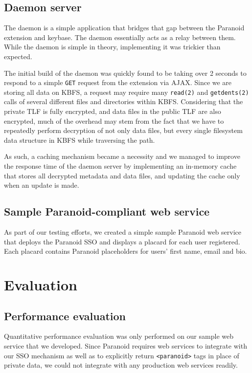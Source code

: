 \documentclass[letterpaper,twocolumn,10pt]{article}
\begin{document}
\subsection{Daemon server}

The daemon is a simple application that bridges that gap between the Paranoid extension and keybase. The daemon essentially acts as a relay between them. While the daemon is simple in theory, implementing it was trickier than expected.

The initial build of the daemon was quickly found to be taking over 2 seconds to respond to a simple \texttt{GET} request from the extension via AJAX. Since we are storing all data on KBFS, a request may require many \texttt{read(2)} and \texttt{getdents(2)} calls of several different files and directories within KBFS. Considering that the private TLF is fully encrypted, and data files in the public TLF are also encrypted, much of the overhead may stem from the fact that we have to repeatedly perform decryption of not only data files, but every single filesystem data structure in KBFS while traversing the path.

As such, a caching mechanism became a necessity and we managed to improve the response time of the daemon server by implementing an in-memory cache that stores all decrypted metadata and data files, and updating the cache only when an update is made.

\subsection{Sample Paranoid-compliant web service}

As part of our testing efforts, we created a simple sample Paranoid web service that deploys the Paranoid SSO and displays a placard for each user registered. Each placard contains Paranoid placeholders for users' first name, email and bio.

\section{Evaluation}

\subsection{Performance evaluation}

Quantitative performance evaluation was only performed on our sample web service that we developed. Since Paranoid requires web services to integrate with our SSO mechanism as well as to explicitly return \texttt{<paranoid>} tags in place of private data, we could not integrate with any production web services readily.
\end{document}
